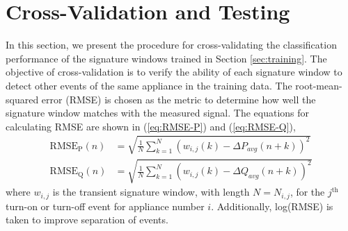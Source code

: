\documentclass[conference]{IEEEtran}
\begin{document}
\section{Cross-Validation and Testing}\label{sec:cv}
In this section, we present the procedure for cross-validating the classification performance of the signature windows trained in Section \ref{sec:training}.  The objective of cross-validation is to verify the ability of each signature window to detect other events of the same appliance in the training data.  The root-mean-squared error (RMSE) is chosen as the metric to determine how well the signature window matches with the measured signal.  The equations for calculating RMSE are shown in (\ref{eq:RMSE-P}) and (\ref{eq:RMSE-Q}),
\begin{align}
\label{eq:RMSE-P}
\text{RMSE}_{\text{P}}(n) &= \sqrt{\frac{1}{N}\sum\limits_{k=1}^{N}(w_{i,j}(k) - \Delta P_{avg}(n+k))^2}\\
\label{eq:RMSE-Q}
\text{RMSE}_{\text{Q}}(n) &= \sqrt{\frac{1}{N}\sum\limits_{k=1}^{N}(w_{i,j}(k) - \Delta Q_{avg}(n+k))^2}
\end{align}
where $w_{i,j}$ is the transient signature window, with length $N = N_{i,j}$, for the $j^{\text{th}}$ turn-on or turn-off event for appliance number $i$.  Additionally, log(RMSE) is taken to improve separation of events.

%
%		
%


\end{document}
